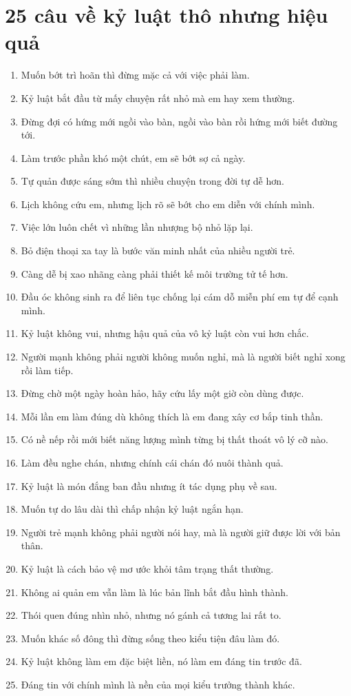 \section{25 câu về kỷ luật thô nhưng hiệu quả}
\begin{enumerate}[leftmargin=*,resume]
\item Muốn bớt trì hoãn thì đừng mặc cả với việc phải làm.
\item Kỷ luật bắt đầu từ mấy chuyện rất nhỏ mà em hay xem thường.
\item Đừng đợi có hứng mới ngồi vào bàn, ngồi vào bàn rồi hứng mới biết đường tới.
\item Làm trước phần khó một chút, em sẽ bớt sợ cả ngày.
\item Tự quản được sáng sớm thì nhiều chuyện trong đời tự dễ hơn.
\item Lịch không cứu em, nhưng lịch rõ sẽ bớt cho em diễn với chính mình.
\item Việc lớn luôn chết vì những lần nhượng bộ nhỏ lặp lại.
\item Bỏ điện thoại xa tay là bước văn minh nhất của nhiều người trẻ.
\item Càng dễ bị xao nhãng càng phải thiết kế môi trường tử tế hơn.
\item Đầu óc không sinh ra để liên tục chống lại cám dỗ miễn phí em tự để cạnh mình.
\item Kỷ luật không vui, nhưng hậu quả của vô kỷ luật còn vui hơn chắc.
\item Người mạnh không phải người không muốn nghỉ, mà là người biết nghỉ xong rồi làm tiếp.
\item Đừng chờ một ngày hoàn hảo, hãy cứu lấy một giờ còn dùng được.
\item Mỗi lần em làm đúng dù không thích là em đang xây cơ bắp tinh thần.
\item Có nề nếp rồi mới biết năng lượng mình từng bị thất thoát vô lý cỡ nào.
\item Làm đều nghe chán, nhưng chính cái chán đó nuôi thành quả.
\item Kỷ luật là món đắng ban đầu nhưng ít tác dụng phụ về sau.
\item Muốn tự do lâu dài thì chấp nhận kỷ luật ngắn hạn.
\item Người trẻ mạnh không phải người nói hay, mà là người giữ được lời với bản thân.
\item Kỷ luật là cách bảo vệ mơ ước khỏi tâm trạng thất thường.
\item Không ai quản em vẫn làm là lúc bản lĩnh bắt đầu hình thành.
\item Thói quen đúng nhìn nhỏ, nhưng nó gánh cả tương lai rất to.
\item Muốn khác số đông thì đừng sống theo kiểu tiện đâu làm đó.
\item Kỷ luật không làm em đặc biệt liền, nó làm em đáng tin trước đã.
\item Đáng tin với chính mình là nền của mọi kiểu trưởng thành khác.
\end{enumerate}

